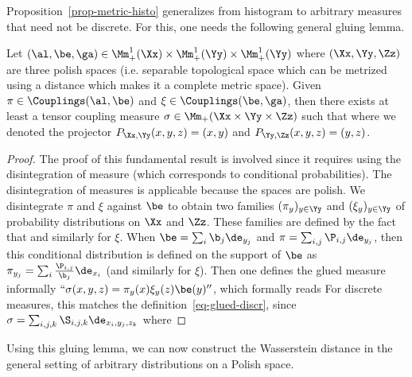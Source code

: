 Proposition~\ref{prop-metric-histo} generalizes from histogram to arbitrary measures that need not be discrete. For this, one needs the following general gluing lemma.

\begin{lem}\label{lem-gluing-general}
	Let $(\al,\be,\ga) \in \Mm_+^1(\Xx) \times \Mm_+^1(\Yy) \times \Mm_+^1(\Yy)$
	where $(\Xx,\Yy,\Zz)$ are three polish spaces (i.e. separable topological space which can be metrized using a distance which makes it a complete metric space).  
	Given $\pi \in \Couplings(\al,\be)$ and $\xi \in \Couplings(\be,\ga)$, then there exists at least a tensor coupling measure
	$\sigma \in \Mm_+(\Xx \times \Yy \times \Zz)$ such that 
	where we denoted the projector $P_{\Xx,\Yy}(x,y,z)=(x,y)$ and $P_{\Yy,\Zz}(x,y,z)=(y,z)$. 
\end{lem}
\begin{proof}
	The proof of this fundamental result is involved since it requires using the disintegration of measure (which corresponds to conditional probabilities). 
	The disintegration of measures is applicable because the spaces are polish. 
	We disintegrate $\pi$ and $\xi$ against $\be$ to obtain two families $(\pi_y)_{y \in \Yy}$ and $(\xi_y)_{y \in \Yy}$ of probability distributions on $\Xx$ and $\Zz$. These families are defined by the fact that 
	and similarly for $\xi$.
	When $\be=\sum_i \b_j \de_{y_j}$ and $\pi=\sum_{i,j} \P_{i,j} \de_{y_j}$, then this conditional distribution is defined on the support of $\be$ as
	$\pi_{y_j} = \sum_i \frac{\P_{i,j}}{\b_j} \de_{x_i}$ (and similarly for $\xi$).
	Then one defines the glued measure informally $``\sigma(x,y,z) = \pi_y(x) \xi_y(z) \be(y)''$, which formally reads
	For discrete measures, this matches the definition~\eqref{eq-glued-discr}, since $\sigma=\sum_{i,j,k} \S_{i,j,k} \de_{x_i,y_j,z_k}$ where
\end{proof}

Using this gluing lemma, we can now construct the Wasserstein distance in the general setting of arbitrary distributions on a Polish space.

